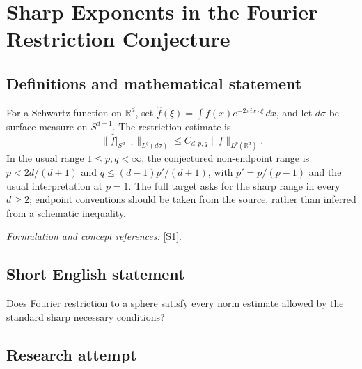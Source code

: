\documentclass[11pt,a4paper]{article}
\newcommand{\R}{\mathbb{R}}
\newcommand{\sref}[2]{\hyperlink{source:#1:#2}{[S#2]}}
\newif\ifshowcatalogue
\newcommand{\cataloguescope}[1]{\ifshowcatalogue
 \paragraph{Exact scope in the supplied catalogue.}
 \begin{quote}\small #1\end{quote}\fi}
\numberwithin{equation}{section}
\begin{document}
\setcounter{section}{0}
\clearpage
\section*{\texorpdfstring{Sharp Exponents in the Fourier Restriction Conjecture}{Sharp Exponents in the Fourier Restriction Conjecture}}\label{statement}
\subsection{Definitions and mathematical statement}
For a Schwartz function on $\R^d$, set $\widehat f(\xi)=\int f(x)e^{-2\pi i x\cdot\xi}\,dx$, and let $d\sigma$ be surface measure on $S^{d-1}$. The restriction estimate is
\[
 \|\widehat f|_{S^{d-1}}\|_{L^q(d\sigma)}\le C_{d,p,q}\|f\|_{L^p(\R^d)}.
\]
In the usual range $1\le p,q<\infty$, the conjectured non-endpoint range is $p<2d/(d+1)$ and $q\le (d-1)p'/(d+1)$, with $p'=p/(p-1)$ and the usual interpretation at $p=1$. The full target asks for the sharp range in every $d\ge2$; endpoint conventions should be taken from the source, rather than inferred from a schematic inequality.
\par\smallskip\textit{Formulation and concept references:} \sref{statement}{1}.
\cataloguescope{Prove the conjectured sharp L\textasciicircum{}p(R\textasciicircum{}d)-to-L\textasciicircum{}q(S\textasciicircum{}\{d-1\}) boundedness range for restriction of the Fourier transform to the unit sphere in every dimension d at least 2, including the non-endpoint range specified by the standard Knapp necessary conditions.}
\subsection{Short English statement}
Does Fourier restriction to a sphere satisfy every norm estimate allowed by the standard sharp necessary conditions?
\subsection{Research attempt}
\end{document}
